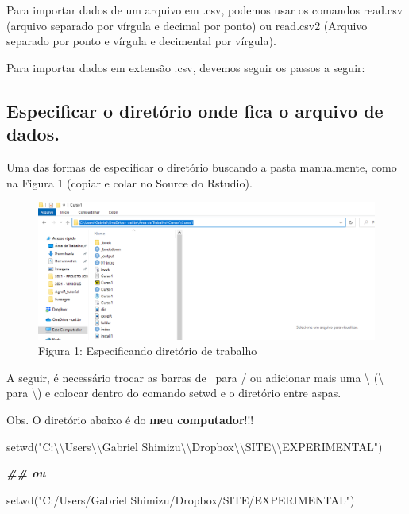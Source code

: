 \documentclass[
]{book}
\newenvironment{Shaded}{\begin{snugshade}}{\end{snugshade}}
\newcommand{\DocumentationTok}[1]{\textcolor[rgb]{0.56,0.35,0.01}{\textbf{\textit{#1}}}}
\newcommand{\FunctionTok}[1]{\textcolor[rgb]{0.00,0.00,0.00}{#1}}
\newcommand{\NormalTok}[1]{#1}
\newcommand{\SpecialCharTok}[1]{\textcolor[rgb]{0.00,0.00,0.00}{#1}}
\newcommand{\StringTok}[1]{\textcolor[rgb]{0.31,0.60,0.02}{#1}}
\begin{document}
Para importar dados de um arquivo em .csv, podemos usar os comandos read.csv (arquivo separado por vírgula e decimal por ponto) ou read.csv2 (Arquivo separado por ponto e vírgula e decimental por vírgula).

Para importar dados em extensão .csv, devemos seguir os passos a seguir:

\hypertarget{especificar-o-diretuxf3rio-onde-fica-o-arquivo-de-dados.}{%
\subsection{Especificar o diretório onde fica o arquivo de dados.}\label{especificar-o-diretuxf3rio-onde-fica-o-arquivo-de-dados.}}

Uma das formas de especificar o diretório buscando a pasta manualmente, como na Figura 1 (copiar e colar no Source do Rstudio).

\begin{figure}
\centering
\includegraphics{pasta.png}
\caption{Figura 1: Especificando diretório de trabalho}
\end{figure}

A seguir, é necessário trocar as barras de ~para / ou adicionar mais uma \textbackslash{} (\textbackslash{} para \textbackslash) e colocar dentro do comando setwd e o diretório entre aspas.

Obs. O diretório abaixo é do \textbf{meu computador}!!!

\begin{Shaded}
\begin{Highlighting}[]
\FunctionTok{setwd}\NormalTok{(}\StringTok{"C:}\SpecialCharTok{\textbackslash{}\textbackslash{}}\StringTok{Users}\SpecialCharTok{\textbackslash{}\textbackslash{}}\StringTok{Gabriel Shimizu}\SpecialCharTok{\textbackslash{}\textbackslash{}}\StringTok{Dropbox}\SpecialCharTok{\textbackslash{}\textbackslash{}}\StringTok{SITE}\SpecialCharTok{\textbackslash{}\textbackslash{}}\StringTok{EXPERIMENTAL"}\NormalTok{)}

\DocumentationTok{\#\# ou}

\FunctionTok{setwd}\NormalTok{(}\StringTok{"C:/Users/Gabriel Shimizu/Dropbox/SITE/EXPERIMENTAL"}\NormalTok{)}
\end{Highlighting}
\end{Shaded}
\end{document}
